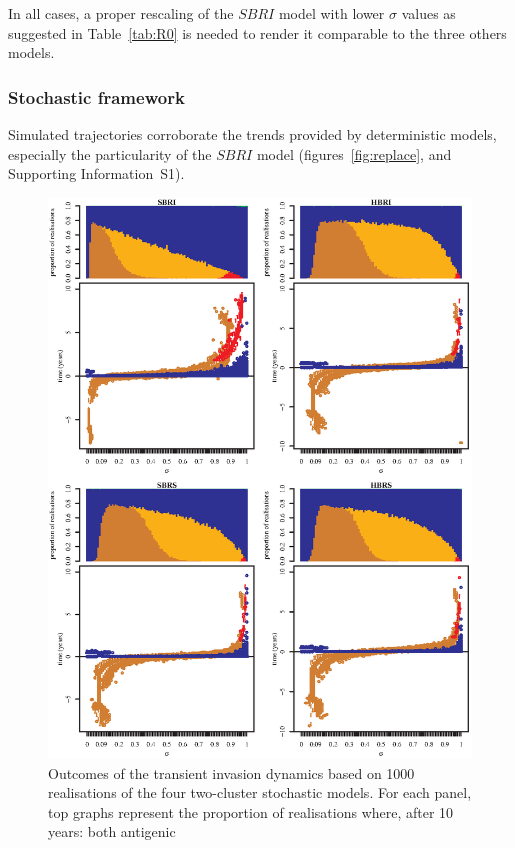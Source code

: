 In all cases, a proper rescaling of the $SBRI$ model with lower
$\sigma$ values as suggested in Table~\ref{tab:R0} is needed to render
it comparable to the three others models.

\clearpage

\subsubsection{Stochastic  framework}

Simulated trajectories corroborate the trends provided by
deterministic models, especially the particularity of the $SBRI$ model
(figures~\ref{fig:replace}, and Supporting Information~S1).



\begin{figure}[!htbp]
\begin{center}
	\includegraphics[width= 0.85 \linewidth]{graphs/article1/figure_5.eps}
\end{center}
        \caption{ Outcomes of the transient invasion dynamics based on
          1000 realisations of the four two-cluster stochastic
          models. For each panel, top graphs represent the proportion
          of realisations where, after 10 years: both antigenic
}
\end{figure}
